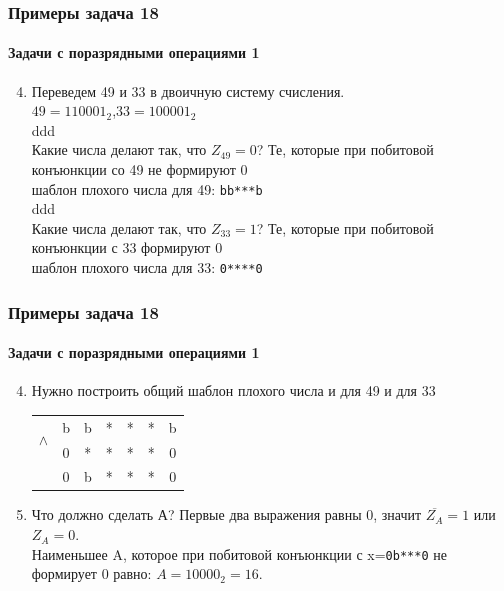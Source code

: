 \begin{frame}[t]
\frametitle{Примеры задача 18}
\framesubtitle{Задачи с поразрядными операциями 1}

	\begin{enumerate}
	\setcounter{enumi}{3}
		\item 
		Переведем 49 и 33 в двоичную систему счисления.\\ 
		$49=110001_2$,$33=100001_2$\\
		\textcolor[rgb]{1,1,1}{ddd}\\ 	\pause 
		Какие числа делают так, что $Z_{49}=0$? Те, которые при побитовой конъюнкции со 49 не формируют 0\\
		шаблон плохого числа для 49: \texttt{bb***b}\\
		\textcolor[rgb]{1,1,1}{ddd}\\ 	\pause 
		Какие числа делают так, что $Z_{33}=1$? Те, которые при побитовой конъюнкции с 33 формируют 0\\
		шаблон плохого числа для 33: \texttt{0****0}
		
							
	\end{enumerate}
	
	
\end{frame}


\begin{frame}[t]
\frametitle{Примеры задача 18}
\framesubtitle{Задачи с поразрядными операциями 1}

	\begin{enumerate}
	\setcounter{enumi}{3}
		\item 
				
		Нужно построить общий шаблон плохого числа и для 49 и для 33\\ 	\pause 
		\begin{tabular}{ccccccc}
\multirow{2}{*}{$\wedge$}
 & b & b & * & * & * & b\tabularnewline
 & 0 & * & * & * & * & 0\tabularnewline
\cline{2-7} \cline{3-7} \cline{4-7} \cline{5-7} \cline{6-7} \cline{7-7} 
 & 0 & b & * & * & * & 0\tabularnewline
\end{tabular}
		
		
		\item Что должно сделать А? Первые два выражения равны 0, значит $\overline{Z_A}=1$ или
		$Z_A=0$.\\ 	\pause 
		Наименьшее A, которое при побитовой конъюнкции с x=\texttt{0b***0} не формирует 0 равно: $A=10000_2=16$.
					
	\end{enumerate}
	
	
\end{frame}

